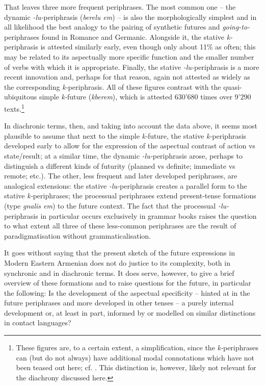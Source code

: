 \documentclass[output=paper,colorlinks,citecolor=brown]{langscibook}
\begin{document}
That leaves three more frequent periphrases. The most common one – the dynamic \textit{-lu-}pe\-ri\-phrasis (\textit{berelu em}) – is also the morphologically simplest and in all likelihood the best analogy to the pairing of synthetic futures and \textit{going-to-}periphrases found in Romance and Germanic. Alongside it, the stative \textit{k-}periphrasis is attested similarly early, even though only about 11\% as often; this may be related to its aspectually more specific function and the smaller number of verbs with which it is appropriate. Finally, the stative \textit{-lu-}periphrasis is a more recent innovation and, perhaps for that reason, again not attested as widely as the corresponding \textit{k-}periphrasis. All of these figures contrast with the quasi-ubiquitous simple \textit{k-}future (\textit{kberem}), which is attested 630'680 times over 9'290 texts.\footnote{These figures are, to a certain extent, a simplification, since the \textit{k-}periphrases can (but do not always) have additional modal connotations which have not been teased out here; cf. \citet{Kozintseva2005}. This distinction is, however, likely not relevant for the diachrony discussed here.}

In diachronic terms, then, and taking into account the data above, it seems most plausible to assume that next to the simple \textit{k-}future, the stative \textit{k-}periphrasis developed early to allow for the expression of the aspectual contrast of action vs state/result; at a similar time, the dynamic \textit{-lu-}periphrasis arose, perhaps to distinguish a different kinds of futurity (planned vs definite; immediate vs remote; etc.). The other, less frequent and later developed periphrases, are analogical extensions: the stative \textit{-lu-}periphrasis creates a parallel form to the stative \textit{k-}periphrases; the processual periphrases extend present-tense formations (type \textit{gnalis em}) to the future context. The fact that the processual \textit{-lu-}periphrasis in particular occurs exclusively in grammar books raises the question to what extent all three of these less-common periphrases are the result of paradigmatisation without grammaticalisation. 

It goes without saying that the present sketch of the future expressions in Modern Eastern Armenian does not do justice to its complexity, both in synchronic and in diachronic terms. It does serve, however, to give a brief overview of these formations and to raise questions for the future, in particular the following: Is the development of the aspectual specificity –  hinted at in the future periphrases and more developed in other tenses – a purely internal development or, at least in part, informed by or modelled on similar distinctions in contact languages?
\end{document}
